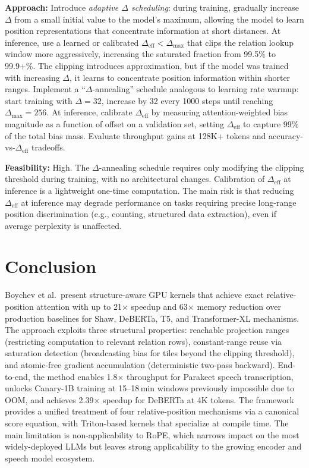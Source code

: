 \documentclass[11pt,a4paper]{article}
\begin{document}
\textbf{Approach:} Introduce \emph{adaptive $\Delta$ scheduling}: during training, gradually increase $\Delta$ from a small initial value to the model's maximum, allowing the model to learn position representations that concentrate information at short distances. At inference, use a learned or calibrated $\Delta_{\mathrm{eff}} < \Delta_{\mathrm{max}}$ that clips the relation lookup window more aggressively, increasing the saturated fraction from 99.5\% to 99.9+\%. The clipping introduces approximation, but if the model was trained with increasing $\Delta$, it learns to concentrate position information within shorter ranges. Implement a ``$\Delta$-annealing'' schedule analogous to learning rate warmup: start training with $\Delta{=}32$, increase by 32 every 1000 steps until reaching $\Delta_{\mathrm{max}}{=}256$. At inference, calibrate $\Delta_{\mathrm{eff}}$ by measuring attention-weighted bias magnitude as a function of offset on a validation set, setting $\Delta_{\mathrm{eff}}$ to capture 99\% of the total bias mass. Evaluate throughput gains at 128K+ tokens and accuracy-vs-$\Delta_{\mathrm{eff}}$ tradeoffs.

\textbf{Feasibility:} High. The $\Delta$-annealing schedule requires only modifying the clipping threshold during training, with no architectural changes. Calibration of $\Delta_{\mathrm{eff}}$ at inference is a lightweight one-time computation. The main risk is that reducing $\Delta_{\mathrm{eff}}$ at inference may degrade performance on tasks requiring precise long-range position discrimination (e.g., counting, structured data extraction), even if average perplexity is unaffected.

\section{Conclusion}
Boychev et al.\ present structure-aware GPU kernels that achieve exact relative-position attention with up to 21$\times$ speedup and 63$\times$ memory reduction over production baselines for Shaw, DeBERTa, T5, and Transformer-XL mechanisms. The approach exploits three structural properties: reachable projection ranges (restricting computation to relevant relation rows), constant-range reuse via saturation detection (broadcasting bias for tiles beyond the clipping threshold), and atomic-free gradient accumulation (deterministic two-pass backward). End-to-end, the method enables 1.8$\times$ throughput for Parakeet speech transcription, unlocks Canary-1B training at 15--18\,min windows previously impossible due to OOM, and achieves 2.39$\times$ speedup for DeBERTa at 4K tokens. The framework provides a unified treatment of four relative-position mechanisms via a canonical score equation, with Triton-based kernels that specialize at compile time. The main limitation is non-applicability to RoPE, which narrows impact on the most widely-deployed LLMs but leaves strong applicability to the growing encoder and speech model ecosystem.
\end{document}
